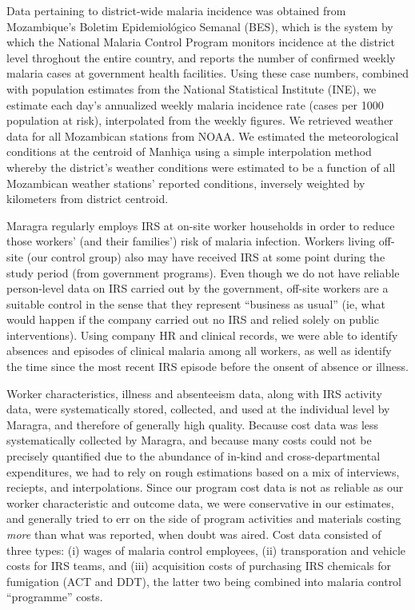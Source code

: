 \documentclass[]{article}
\begin{document}
Data pertaining to district-wide malaria incidence was obtained from
Mozambique's Boletim Epidemiológico Semanal (BES), which is the system
by which the National Malaria Control Program monitors incidence at the
district level throghout the entire country, and reports the number of
confirmed weekly malaria cases at government health facilities. Using
these case numbers, combined with population estimates from the National
Statistical Institute (INE), we estimate each day's annualized weekly
malaria incidence rate (cases per 1000 population at risk), interpolated
from the weekly figures. We retrieved weather data for all Mozambican
stations from NOAA. We estimated the meteorological conditions at the
centroid of Manhiça using a simple interpolation method whereby the
district's weather conditions were estimated to be a function of all
Mozambican weather stations' reported conditions, inversely weighted by
kilometers from district centroid.

Maragra regularly employs IRS at on-site worker households in order to
reduce those workers' (and their families') risk of malaria infection.
Workers living off-site (our control group) also may have received IRS
at some point during the study period (from government programs). Even
though we do not have reliable person-level data on IRS carried out by
the government, off-site workers are a suitable control in the sense
that they represent ``business as usual'' (ie, what would happen if the
company carried out no IRS and relied solely on public interventions).
Using company HR and clinical records, we were able to identify absences
and episodes of clinical malaria among all workers, as well as identify
the time since the most recent IRS episode before the onsent of absence
or illness.

Worker characteristics, illness and absenteeism data, along with IRS
activity data, were systematically stored, collected, and used at the
individual level by Maragra, and therefore of generally high quality.
Because cost data was less systematically collected by Maragra, and
because many costs could not be precisely quantified due to the
abundance of in-kind and cross-departmental expenditures, we had to rely
on rough estimations based on a mix of interviews, reciepts, and
interpolations. Since our program cost data is not as reliable as our
worker characteristic and outcome data, we were conservative in our
estimates, and generally tried to err on the side of program activities
and materials costing \emph{more} than what was reported, when doubt was
aired. Cost data consisted of three types: (i) wages of malaria control
employees, (ii) transporation and vehicle costs for IRS teams, and (iii)
acquisition costs of purchasing IRS chemicals for fumigation (ACT and
DDT), the latter two being combined into malaria control ``programme''
costs.
\end{document}
